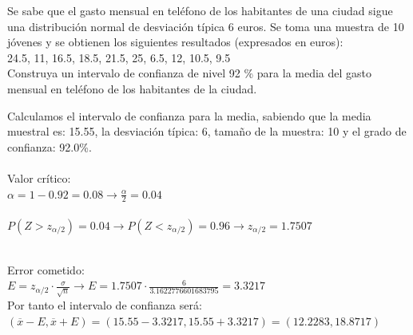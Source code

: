 \documentclass[spanish, 11pt]{exam}
\begin{document}
        \begin{questions}
        \question Se sabe que el gasto mensual en teléfono de los habitantes de una ciudad sigue una distribución normal
de desviación típica 6 euros. Se toma una muestra de 10 jóvenes y se obtienen los siguientes resultados (expresados 
en euros): \\ 24.5, 11, 16.5, 18.5, 21.5, 25, 6.5, 12,
10.5, 9.5  \\ Construya un intervalo de confianza de nivel 92 \% para la media del gasto mensual en 
teléfono de los habitantes 
de la ciudad. \begin{solution}   Calculamos el intervalo de confianza para la media, sabiendo que la media muestral es: 15.55, la desviación típica: 6, tamaño de la muestra: 10 y el grado de confianza: 92.0\%. \\ \\ Valor crítico: \\ $\alpha=1-0.92=0.08\to \frac{\alpha}{2}=0.04$ \\ \\ $P(Z>z_{\alpha/2})=0.04\to P(Z<z_{\alpha/2})=0.96 \to z_{\alpha/2} =1.7507$ \\ 
     \\
    Error cometido: \\ $E=z_{\alpha/2}\cdot \frac{\sigma}{\sqrt{n}} \to E=1.7507\cdot \frac{6}{3.1622776601683795}=3.3217$ \\ Por tanto el intervalo de confianza será: \\$\left(\overline{x} - E , \overline{x} + E \right)=\left(15.55 - 3.3217 , 15.55 + 3.3217 \right)=\left(12.2283, 18.8717 \right)$ \\  \\ 

\end{solution}
\end{questions}
\end{document}
